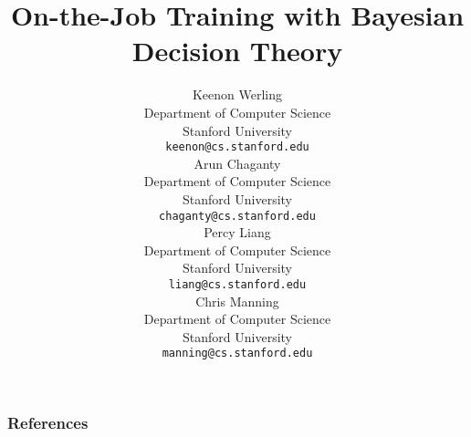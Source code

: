 \documentclass{article} %
\title{On-the-Job Training with Bayesian Decision Theory}
\author{%
Keenon Werling\\
Department of Computer Science\\
Stanford University\\
\texttt{keenon@cs.stanford.edu} \\
\And
Arun Chaganty\\
Department of Computer Science\\
Stanford University\\
\texttt{chaganty@cs.stanford.edu} \\
\And
Percy Liang\\
Department of Computer Science\\
Stanford University\\
\texttt{liang@cs.stanford.edu} \\
\And
Chris Manning\\
Department of Computer Science\\
Stanford University\\
\texttt{manning@cs.stanford.edu} \\
}
\begin{document}
\usetikzlibrary{positioning}

\maketitle



%
%


%

%
%




%

\subsubsection*{References}



\end{document}
